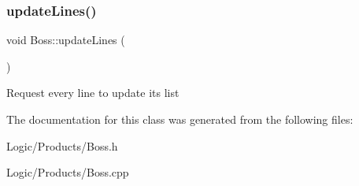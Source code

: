 \subsubsection{\texorpdfstring{updateLines()}{updateLines()}}
{\footnotesize\ttfamily void Boss\+::update\+Lines (\begin{DoxyParamCaption}{ }\end{DoxyParamCaption})}

Request every line to update its list 

The documentation for this class was generated from the following files\+:\begin{DoxyCompactItemize}
\item 
Logic/\+Products/Boss.\+h\item 
Logic/\+Products/Boss.\+cpp\end{DoxyCompactItemize}
